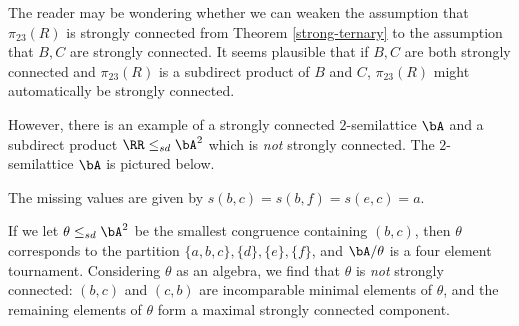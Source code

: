 \begin{ex}\label{ex-subdirect-2-semi-not-absorption-free} The reader may be wondering whether we can weaken the assumption that $\pi_{23}(R)$ is strongly connected from Theorem \ref{strong-ternary} to the assumption that $B,C$ are strongly connected. It seems plausible that if $B,C$ are both strongly connected and $\pi_{23}(R)$ is a subdirect product of $B$ and $C$, $\pi_{23}(R)$ might automatically be strongly connected.

However, there is an example of a strongly connected $2$-semilattice $\bA$ and a subdirect product $\RR \le_{sd} \bA^2$ which is \emph{not} strongly connected. The $2$-semilattice $\bA$ is pictured below.
\begin{center}
\end{center}
The missing values are given by $s(b,c) = s(b,f) = s(e,c) = a$.

If we let $\theta \le_{sd} \bA^2$ be the smallest congruence containing $(b,c)$, then $\theta$ corresponds to the partition $\{a,b,c\},\{d\},\{e\},\{f\}$, and $\bA/\theta$ is a four element tournament. Considering $\theta$ as an algebra, we find that $\theta$ is \emph{not} strongly connected: $(b,c)$ and $(c,b)$ are incomparable minimal elements of $\theta$, and the remaining elements of $\theta$ form a maximal strongly connected component.
\end{ex}

